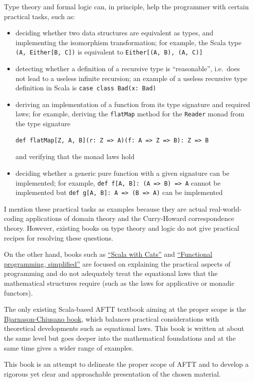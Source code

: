 Type theory and formal logic can, in principle, help the programmer
with certain practical tasks, such as:
\begin{itemize}
\item deciding whether two data structures are equivalent as types, and
implementing the isomorphism transformation; for example, the Scala
type \lstinline!(A, Either[B, C])! is equivalent to \lstinline!Either[(A, B), (A, C)]! 
\item detecting whether a definition of a recursive type is ``reasonable'',
i.e.~does not lead to a useless infinite recursion; an example of
a useless recursive type definition in Scala is \lstinline!case class Bad(x: Bad)! 
\item deriving an implementation of a function from its type signature and
required laws; for example, deriving the \lstinline!flatMap! method
for the \lstinline!Reader! monad from the type signature 
\begin{lstlisting}
def flatMap[Z, A, B](r: Z => A)(f: A => Z => B): Z => B
\end{lstlisting}
 and verifying that the monad laws hold
\item deciding whether a generic pure function with a given signature can
be implemented; for example, \lstinline!def f[A, B]: (A => B) => A!
cannot be implemented but \lstinline!def g[A, B]: A => (B => A)!
can be implemented 
\end{itemize}
I mention these practical tasks as examples because they are actual
real-world-coding applications of domain theory and the Curry-Howard
correspondence theory. However, existing books on type theory and
logic do not give practical recipes for resolving these questions.

On the other hand, books such as \href{https://underscore.io/books/scala-with-cats/}{\textquotedblleft Scala with Cats\textquotedblright}
and \href{https://alvinalexander.com/scala/functional-programming-simplified-book}{\textquotedblleft Functional programming, simplified\textquotedblright}
are focused on explaining the practical aspects of programming and
do not adequately treat the equational laws that the mathematical
structures require (such as the laws for applicative or monadic functors).

The only existing Scala-based AFTT textbook aiming at the proper scope
is the \href{https://www.manning.com/books/functional-programming-in-scala}{Bjarnason-Chiusano book},
which balances practical considerations with theoretical developments
such as equational laws. This book is written at about the same level
but goes deeper into the mathematical foundations and at the same
time gives a wider range of examples.

This book is an attempt to delineate the proper scope of AFTT and
to develop a rigorous yet clear and approachable presentation of the
chosen material. 
